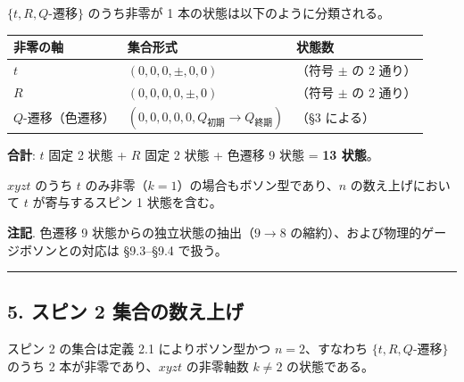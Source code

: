 \documentclass[
  a4paper,11pt]{ltjsarticle}
\newcounter{none}
\theoremstyle{definition}
\theoremstyle{remark}
\begin{document}
\(\{t, R, Q\text{-遷移}\}\) のうち非零が 1
本の状態は以下のように分類される。

{\def\LTcaptype{none} %
\begin{longtable}[]{@{}
  >{\raggedright\arraybackslash}p{}
  >{\raggedright\arraybackslash}p{}
  >{\centering\arraybackslash}p{}@{}}
\toprule\noalign{}
\begin{minipage}[b]{\linewidth}\raggedright
非零の軸
\end{minipage} & \begin{minipage}[b]{\linewidth}\raggedright
集合形式
\end{minipage} & \begin{minipage}[b]{\linewidth}\centering
状態数
\end{minipage} \\
\midrule\noalign{}
\endhead
\bottomrule\noalign{}
\endlastfoot
\(t\) & \((0, 0, 0, \pm, 0, 0)\) & 2（符号 \(\pm\) の 2 通り） \\
\(R\) & \((0, 0, 0, 0, \pm, 0)\) & 2（符号 \(\pm\) の 2 通り） \\
\(Q\)-遷移（色遷移） &
\((0, 0, 0, 0, 0, Q_\text{初期} \to Q_\text{終期})\) & 9（§3 による） \\
\end{longtable}
}

\textbf{合計}: \(t\) 固定 2 状態 + \(R\) 固定 2 状態 + 色遷移 9 状態 =
\textbf{13 状態}。

\(xyzt\) のうち \(t\) のみ非零（\(k = 1\)）の場合もボソン型であり、\(n\)
の数え上げにおいて \(t\) が寄与するスピン 1 状態を含む。

\textbf{注記}. 色遷移 9 状態からの独立状態の抽出（\(9 \to 8\)
の縮約）、および物理的ゲージボソンとの対応は §9.3--§9.4 で扱う。

\begin{center}\rule{0.5\linewidth}{0.5pt}\end{center}

\subsection{5. スピン 2
集合の数え上げ}\label{ux30b9ux30d4ux30f3-2-ux96c6ux5408ux306eux6570ux3048ux4e0aux3052}

スピン 2 の集合は定義 2.1 によりボソン型かつ \(n = 2\)、すなわち
\(\{t, R, Q\text{-遷移}\}\) のうち 2 本が非零であり、\(xyzt\) の非零軸数
\(k \neq 2\) の状態である。
\end{document}

